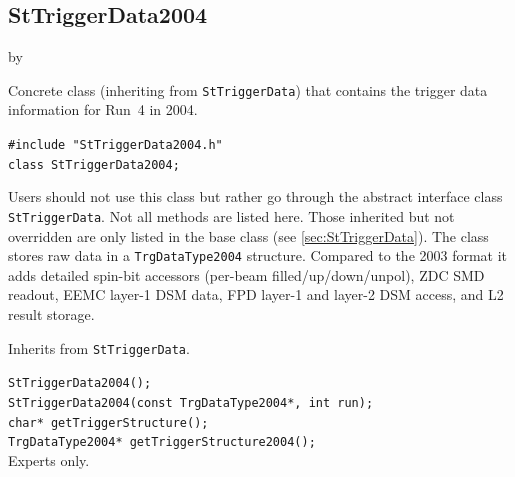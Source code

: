 \documentclass[twoside]{article}
\newcommand{\entrylabel}[1]{\mbox{\textbf{{#1}}}\hfil}%
\newenvironment{entry}
{\begin{list}{}%
    {\renewcommand{\makelabel}{\entrylabel}%
     \setlength{\labelwidth}{90pt}%
     \setlength{\leftmargin}{\labelwidth}
     \advance\leftmargin by \labelsep%
      }%
    }%
  {\end{list}}
\newcommand{\Entrylabel}[1]%
{\raisebox{0pt}[1ex][0pt]{\makebox[\labelwidth][l]%
    {\parbox[t]{\labelwidth}{\hspace{0pt}\textbf{{#1}}}}}}
\newenvironment{Entry}%
{\renewcommand{\entrylabel}{\Entrylabel}\begin{entry}}%
  {\end{entry}}
\begin{document}
\subsection{StTriggerData2004}
\label{sec:StTriggerData2004}
\begin{Entry}
\item[Summary] Concrete class (inheriting from \texttt{StTriggerData}) that
    contains the trigger data information for Run~4 in 2004.
\item[Synopsis]
    \verb+#include "StTriggerData2004.h"+\\
    \verb+class StTriggerData2004;+\\
\item[Description] Users should not use this class but rather go through the
    abstract interface class \texttt{StTriggerData}.  Not all methods are listed
    here.  Those inherited but not overridden are only listed in the base class
    (see \ref{sec:StTriggerData}).  The class stores raw data in a
    \verb+TrgDataType2004+ structure.  Compared to the 2003 format it adds
    detailed spin-bit accessors (per-beam filled/up/down/unpol), ZDC SMD readout,
    EEMC layer-1 DSM data, FPD layer-1 and layer-2 DSM access, and L2 result
    storage.
\item[Related Classes] Inherits from \texttt{StTriggerData}.
\item[Public\\ Constructors]
    \verb+StTriggerData2004();+\\
    \verb+StTriggerData2004(const TrgDataType2004*, int run);+\\
    \verb+char* getTriggerStructure();+\\
    \verb+TrgDataType2004* getTriggerStructure2004();+\\
    Experts only.
\end{Entry}
\clearpage
\end{document}
